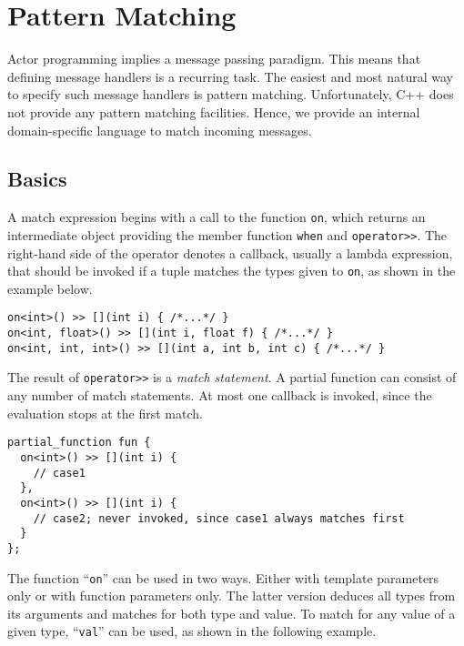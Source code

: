 \section{Pattern Matching}
\label{Sec::PatternMatching}

Actor programming implies a message passing paradigm.
This means that defining message handlers is a recurring task.
The easiest and most natural way to specify such message handlers is pattern matching.
Unfortunately, C++ does not provide any pattern matching facilities.
Hence, we provide an internal domain-specific language to match incoming messages.

\subsection{Basics}
\label{Sec::PatternMatching::Basics}

A match expression begins with a call to the function \lstinline^on^, which returns an intermediate object providing the member function \lstinline^when^ and \lstinline^operator>>^.
The right-hand side of the operator denotes a callback, usually a lambda expression, that should be invoked if a tuple matches the types given to \lstinline^on^,
as shown in the example below.

\begin{lstlisting}
on<int>() >> [](int i) { /*...*/ }
on<int, float>() >> [](int i, float f) { /*...*/ }
on<int, int, int>() >> [](int a, int b, int c) { /*...*/ }
\end{lstlisting}

The result of \lstinline^operator>>^ is a \textit{match statement}.
A partial function can consist of any number of match statements.
At most one callback is invoked, since the evaluation stops at the first match.

\begin{lstlisting}
partial_function fun {
  on<int>() >> [](int i) {
    // case1
  },
  on<int>() >> [](int i) {
    // case2; never invoked, since case1 always matches first
  }
};
\end{lstlisting}

The function ``\lstinline^on^'' can be used in two ways.
Either with template parameters only or with function parameters only.
The latter version deduces all types from its arguments and matches for both type and value.
To match for any value of a given type, ``\lstinline^val^'' can be used, as shown in the following example.

